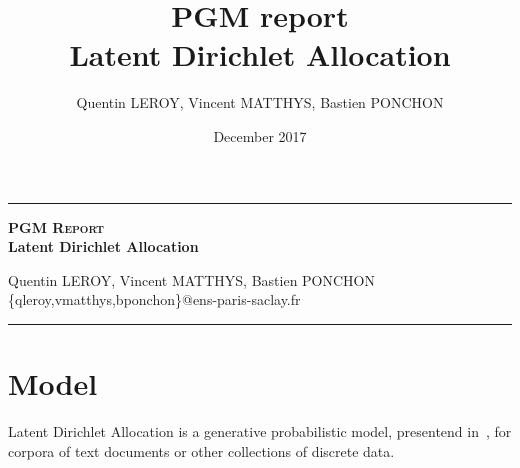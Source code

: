 \documentclass[12pt,a4paper,onecolumn]{article}
\title{PGM report \\ Latent Dirichlet Allocation}
\author{Quentin LEROY, Vincent MATTHYS, Bastien PONCHON}
\date{December 2017}
\begin{document}
\begin{center}

	\rule[11pt]{5cm}{0.5pt}

	\textbf{\Large \textsc{PGM Report} \\ Latent Dirichlet Allocation}
	\vspace{0.5cm}

	Quentin LEROY, Vincent MATTHYS, Bastien PONCHON\\
	\{qleroy,vmatthys,bponchon\}@ens-paris-saclay.fr

	\rule{5cm}{0.5pt}

\end{center}

\section{Model}


Latent Dirichlet Allocation is a generative probabilistic model, presentend in~\cite{lda_2003}, for corpora of text documents or other collections of discrete data.
\end{document}
